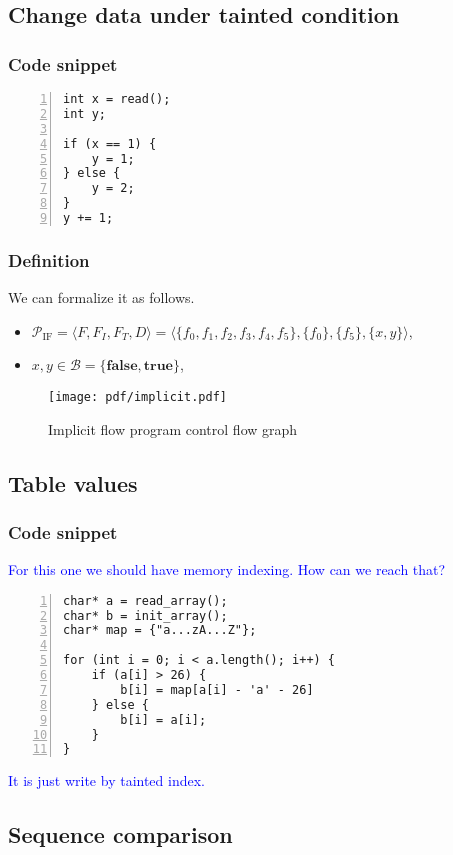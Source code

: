 \documentclass[fleqn,oneside,a4]{article}
\newcommand{\sublevel}{\subsection}
\newcommand{\subsublevel}{\subsubsection}
\newcommand{\comment}[1]{\textcolor{blue}{#1}}  %
\newcommand{\true}{\textbf{true}}
\newcommand{\false}{\textbf{false}}
\begin{document}
\sublevel{Change data under tainted condition}

\subsublevel*{Code snippet}

\begin{lstlisting}[numbers=left,numberstyle=\scriptsize]
int x = read();
int y;

if (x == 1) {
    y = 1;
} else {
    y = 2;
}
y += 1;
\end{lstlisting}

\subsublevel*{Definition}

We can formalize it as follows.
\begin{itemize}
    \item $\mathcal{P}_\text{IF} = \langle F, F_I, F_T, D \rangle =
    \langle \{f_0, f_1, f_2, f_3, f_4, f_5\},
        \{f_0\}, \{f_5\}, \{x, y\} \rangle$,
    \item $x, y \in \mathcal{B} = \{\false, \true\}$,
\end{itemize}

\begin{figure}[h!]
    \begin{center}
        \texttt{[image: pdf/implicit.pdf]}
    \end{center}
    \caption{Implicit flow program control flow graph}
\end{figure}

\sublevel{Table values}

\subsublevel*{Code snippet}

 \comment{For this one we should have memory indexing.
How can we reach that?}

\begin{lstlisting}[numbers=left,numberstyle=\scriptsize]
char* a = read_array();
char* b = init_array();
char* map = {"a...zA...Z"};

for (int i = 0; i < a.length(); i++) {
    if (a[i] > 26) {
        b[i] = map[a[i] - 'a' - 26]
    } else {
        b[i] = a[i];
    }
}
\end{lstlisting}

 \comment{It is just write by tainted index.}

\sublevel{Sequence comparison}
\end{document}
